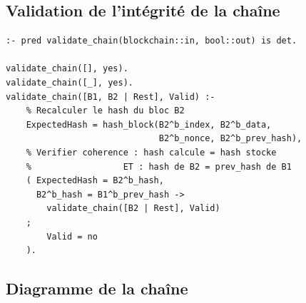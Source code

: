 \documentclass[12pt,a4paper]{article}
\begin{document}
\subsection{Validation de l'intégrité de la chaîne}

\begin{lstlisting}[caption={Validation de la blockchain en Mercury}]
:- pred validate_chain(blockchain::in, bool::out) is det.

validate_chain([], yes).
validate_chain([_], yes).
validate_chain([B1, B2 | Rest], Valid) :-
    % Recalculer le hash du bloc B2
    ExpectedHash = hash_block(B2^b_index, B2^b_data,
                              B2^b_nonce, B2^b_prev_hash),
    % Verifier coherence : hash calcule = hash stocke
    %                  ET : hash de B2 = prev_hash de B1
    ( ExpectedHash = B2^b_hash,
      B2^b_hash = B1^b_prev_hash ->
        validate_chain([B2 | Rest], Valid)
    ;
        Valid = no
    ).
\end{lstlisting}

\subsection{Diagramme de la chaîne}
\end{document}
